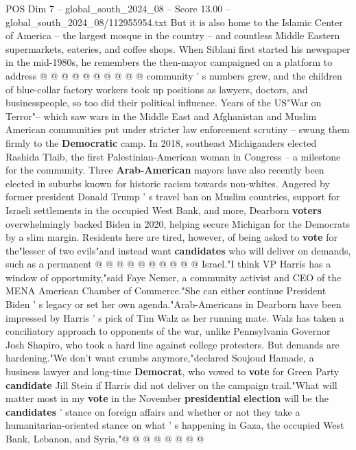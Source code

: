 \begin{textsample}{POS Dim 7 – global\_south\_2024\_08 – Score 13.00 – global\_south\_2024\_08/112955954.txt}
But it is also home to the Islamic Center of America -- the largest mosque in the country -- and countless Middle Eastern supermarkets, eateries, and coffee shops.
When Siblani first started his newspaper in the mid-1980s, he remembers the then-mayor campaigned on a platform to address @ @ @ @ @ @ @ @ @ @ community ' s numbers grew, and the children of blue-collar factory workers took up positions as lawyers, doctors, and businesspeople, so too did their political influence.
Years of the US"War on Terror"-- which saw wars in the Middle East and Afghanistan and Muslim American communities put under stricter law enforcement scrutiny -- swung them firmly to the \textbf{Democratic} camp.
In 2018, southeast Michiganders elected Rashida Tlaib, the first Palestinian-American woman in Congress -- a milestone for the community.
Three \textbf{Arab-American} mayors have also recently been elected in suburbs known for historic racism towards non-whites.
Angered by former president Donald Trump ' s travel ban on Muslim countries, support for Israeli settlements in the occupied West Bank, and more, Dearborn \textbf{voters} overwhelmingly backed Biden in 2020, helping secure Michigan for the Democrats by a slim margin.
Residents here are tired, however, of being asked to \textbf{vote} for the"lesser of two evils"and instead want \textbf{candidates} who will deliver on demands, such as a permanent @ @ @ @ @ @ @ @ @ @ Israel."I think VP Harris has a window of opportunity,"said Faye Nemer, a community activist and CEO of the MENA American Chamber of Commerce."She can either continue President Biden ' s legacy or set her own agenda."Arab-Americans in Dearborn have been impressed by Harris ' s pick of Tim Walz as her running mate.
Walz has taken a conciliatory approach to opponents of the war, unlike Pennsylvania Governor Josh Shapiro, who took a hard line against college protesters.
But demands are hardening."We don't want crumbs anymore,"declared Soujoud Hamade, a business lawyer and long-time \textbf{Democrat}, who vowed to \textbf{vote} for Green Party \textbf{candidate} Jill Stein if Harris did not deliver on the campaign trail."What will matter most in my \textbf{vote} in the November \textbf{presidential} \textbf{election} will be the \textbf{candidates} ' stance on foreign affairs and whether or not they take a humanitarian-oriented stance on what ' s happening in Gaza, the occupied West Bank, Lebanon, and Syria,"@ @ @ @ @ @ @ @

\end{textsample}
